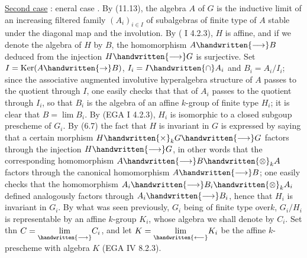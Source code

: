 \uline{Second case} : eneral case . By (11.13), the algebra $A$ of $G$ is the inductive limit of an increasing filtered family $(A_i)_{i\in I}$ of subalgebras of finite type of $A$ stable under the diagonal map and the involution. By ( I 4.2.3), $H$ is affine, and if we denote the algebra of $H$ by $B$, the homomorphism $A\handwritten{\longrightarrow}B$ deduced from the injection $H\handwritten{\longrightarrow}G$ is surjective. Set $I=\operatorname{Ker}(A\handwritten{\to}B)$, $I_i=I\handwritten{\cap}A_i$ and $B_i=A_i/I_i$; since the associative augmented involutive hyperalgebra structure of $A$ passes to the quotient through $I$, one easily checks that that of $A_i$ passes to the quotient through $I_i$, so that $B_i$ is the algebra of an affine $k$-group of finite type $H_i$; it is clear that $B=\lim B_i$. By (EGA I 4.2.3), $H_i$ is isomorphic to a closed subgoup prescheme of $G_i$. By (6.7) the fact that $H$ is invariant in $G$ is expressed by saying that a certain morphism $H\handwritten{\times}_k G\handwritten{\longrightarrow}G$ factors through the injection $H\handwritten{\longrightarrow}G$, in other words that the corresponding homomorphism $A\handwritten{\longrightarrow}B\handwritten{\otimes}_k A$ factors through the canonical homomorphism $A\handwritten{\longrightarrow}B$; one easily checks that the homomorphism $A_i\handwritten{\longrightarrow}B_i\handwritten{\otimes}_k A_i$ defined analogously factors through $A_i\handwritten{\longrightarrow}B_i$, hence that $H_i$ is invariant in $G_i$. By what was seen previously, $G_i$ being of finite type over$k$, $G_i/H_i$ is representable by an affine $k$-group $K_i$, whose algebra we shall denote by $C_i$. Set thn $C=\underset{\handwritten{\longrightarrow}}{\lim}C_i$, and let $K=\underset{\handwritten{\longleftarrow}}{\lim}K_i$ be the affine $k$-prescheme with algebra $K$ (EGA IV 8.2.3).


